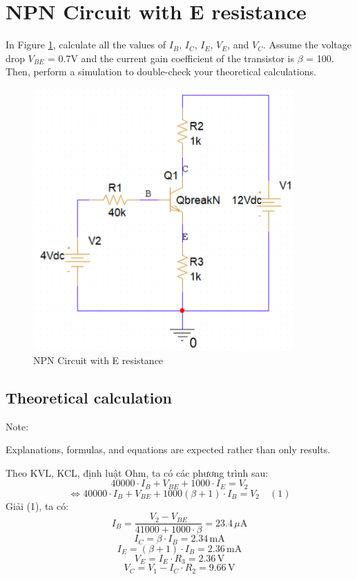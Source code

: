 \section{NPN Circuit with E resistance}
In Figure \ref{lab3_ex9_de}, calculate all the values of $I_B$, $I_C$, $I_E$, $V_E$, and $V_C$. Assume the voltage drop $V_{BE}$ = 0.7V and the current gain coefficient of the transistor is $\beta$ = 100. Then, perform a simulation to double-check your theoretical calculations.

\begin{figure}[h]
    \centering
    \includegraphics[width=10cm]{graphics/ex8/lab3_ex9_de.png}
    \caption{NPN Circuit with E resistance}
    \label{lab3_ex9_de}
\end{figure}

\subsection{Theoretical calculation}
Note:

Explanations, formulas, and equations are expected rather than only results.

Theo KVL, KCL, định luật Ohm, ta có các phương trình sau:
\[
40000 \cdot I_B + V_{BE} + 1000 \cdot I_E = V_2
\]
\[
\Leftrightarrow 40000 \cdot I_B + V_{BE} + 1000(\beta + 1) \cdot I_B = V_2 \quad (1)
\]
Giải (1), ta có: 
\[
I_B = \frac{V_2 - V_{BE}}{41000 + 1000 \cdot \beta} = 23.4 \, \mu \text{A}
\]
\[
I_C = \beta \cdot I_B = 2.34 \, \text{mA}
\]
\[
I_E = (\beta + 1) \cdot I_B = 2.36 \, \text{mA}
\]
\[
V_E = I_E \cdot R_3 = 2.36 \, \text{V}
\]
\[
V_C = V_1 - I_C \cdot R_2 = 9.66 \, \text{V}
\]

